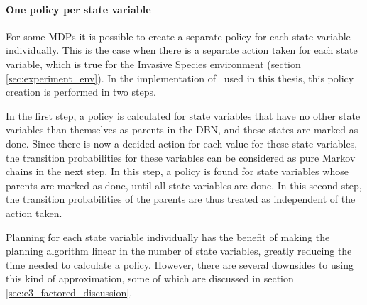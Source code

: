 \paragraph{One policy per state variable}
\label{sec:one_policy_per_state_variable}

For some MDPs it is possible to create a separate policy for each state
variable individually. This is the case when there is a separate action taken
for each state variable, which is true for the Invasive Species environment
(section \ref{sec:experiment_env}). In the implementation of \etre\ used in
this thesis, this policy creation is performed in two steps. 

In the first step, a policy is calculated for state variables that have no
other state variables than themselves as parents in the DBN, and these states
are marked as done. Since there is now a decided action for each value for
these state variables, the transition probabilities for these variables can be
considered as pure Markov chains in the next step. In this step, a policy is found for state
variables whose parents are marked as done, until all state variables are done.
In this second step, the transition probabilities of the parents are thus
treated as independent of the action taken.

Planning for each state variable individually has the benefit of making the
planning algorithm linear in the number of state variables, greatly reducing
the time needed to calculate a policy. However, there are several downsides to
using this kind of approximation, some of which are discussed in section
\ref{sec:e3_factored_discussion}.
